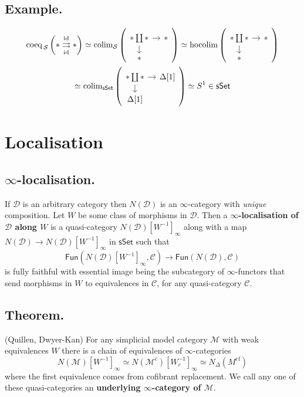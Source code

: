 \documentclass{article}
\numberwithin{equation}{subsection}
\renewcommand{\ss}[1]{\subsection{#1}}
\newcommand{\sset}{\mathsf{sSet}}
\newcommand{\C}{\mathcal{C}}
\newcommand{\D}{\mathcal{D}}
\newcommand{\M}{\mathcal{M}}
\newcommand{\id}{\mathrm{id}}
\renewcommand{\S}{\mathcal{S}}
\begin{document}
        \ss{Example.}
            \begin{gather*}
                \operatorname{coeq}_{\,\S}\left(
                    *\underset{\id}{\overset{\id}{\rightrightarrows}}*
                \right) \simeq
                \operatorname{colim}_\S\left(
                    \begin{tikzcd}[row sep=1em,column sep=1em,ampersand replacement=\&]
                        *\coprod* \dar\rar \& *\\
                        *
                    \end{tikzcd}
                \right) \simeq
                \operatorname{hocolim}\left(
                    \begin{tikzcd}[row sep=1em,column sep=1em,ampersand replacement=\&]
                        *\coprod* \dar\rar \& *\\
                        *
                    \end{tikzcd}
                \right) \\\simeq
                \operatorname{colim}_\sset\left(
                    \begin{tikzcd}[row sep=1em,column sep=1em,ampersand replacement=\&]
                        *\coprod* \dar\rar \& \Delta[1]\\
                        \Delta[1]
                    \end{tikzcd}
                \right) \simeq
                S^1\in\sset
            \end{gather*}

    \section{Localisation}

        \ss{$\infty$-localisation.}
            If $\D$ is an arbitrary category then $N(\D)$ is an $\infty$-category with \emph{unique} composition.
            Let $W$ be some class of morphisms in $\D$.
            Then a \textbf{$\infty$-localisation of $\D$ along $W$} is a quasi-category $N(\D)[W^{-1}]_\infty$ along with a map $N(\D)\to N(\D)[W^{-1}]_\infty$ in $\sset$ such that
            \[
                \mathsf{Fun}(N(\D)[W^{-1}]_\infty,\C)\to\mathsf{Fun}(N(\D),\C)
            \]
            is fully faithful with essential image being the subcategory of $\infty$-functors that send morphisms in $W$ to equivalences in $\C$, for any quasi-category $\C$.

        \ss{Theorem.} (Quillen, Dwyer-Kan)
            For any simplicial model category $\M$ with weak equivalences $W$ there is a chain of equivalences of $\infty$-categories
            \[
                N(\M)[W^{-1}]_\infty \simeq N(\M^c)[W^{-1}_c]_\infty \simeq N_\Delta(M^\mathrm{cf})
            \]
            where the first equivalence comes from cofibrant replacement.
            We call any one of these quasi-categories an \textbf{underlying $\infty$-category of $\M$}.
\end{document}

